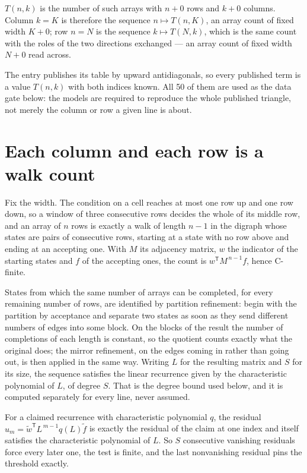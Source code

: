 \documentclass[11pt]{article}
\theoremstyle{definition}
\begin{document}
$T(n,k)$ is the number of such arrays with $n + 0$ rows and $k + 0$ columns. Column $k = K$ is therefore the sequence $n \mapsto T(n,K)$, an array count of fixed width $K + 0$; row $n = N$ is the sequence $k \mapsto T(N,k)$, which is the same count with the roles of the two directions exchanged --- an array count of fixed width $N + 0$ read across.

The entry publishes its table by upward antidiagonals, so every published term is a value $T(n,k)$ with both indices known. All 50 of them are used as the data gate below: the models are required to reproduce the whole published triangle, not merely the column or row a given line is about.

\section{Each column and each row is a walk count}

Fix the width. The condition on a cell reaches at most one row up and one row down, so a window of three consecutive rows decides the whole of its middle row, and an array of $n$ rows is exactly a walk of length $n-1$ in the digraph whose states are pairs of consecutive rows, starting at a state with no row above and ending at an accepting one. With $M$ its adjacency matrix, $w$ the indicator of the starting states and $f$ of the accepting ones, the count is $w^{\mathsf T}M^{\,n-1}f$, hence C-finite.

States from which the same number of arrays can be completed, for every remaining number of rows, are identified by partition refinement: begin with the partition by acceptance and separate two states as soon as they send different numbers of edges into some block. On the blocks of the result the number of completions of each length is constant, so the quotient counts exactly what the original does; the mirror refinement, on the edges coming in rather than going out, is then applied in the same way. Writing $L$ for the resulting matrix and $S$ for its size, the sequence satisfies the linear recurrence given by the characteristic polynomial of $L$, of degree $S$. That is the degree bound used below, and it is computed separately for every line, never assumed.

For a claimed recurrence with characteristic polynomial $q$, the residual $u_m = \tilde w^{\mathsf T}L^{\,m-1}q(L)\tilde f$ is exactly the residual of the claim at one index and itself satisfies the characteristic polynomial of $L$. So $S$ consecutive vanishing residuals force every later one, the test is finite, and the last nonvanishing residual pins the threshold exactly.
\end{document}
